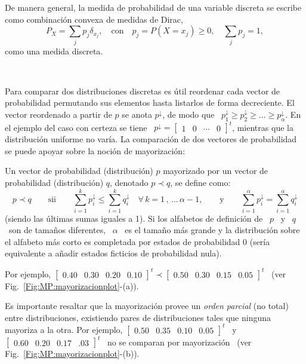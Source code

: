 De manera general, la medida de probabilidad de una variable discreta se escribe
como combinaci\'on convexa de medidas de Dirac,
%
\[
P_X =  \sum_j p_j  \delta_{x_j}, \quad  \mbox{con} \quad p_j =  P(X=x_j) \ge  0, \quad
\sum_j p_j = 1,
\]
%
\noindent \ie como una medida discreta.

\

Para comparar  dos distribuciones discretas  es \'util reordenar cada  vector de
probabilidad permutando  sus elementos hasta listarlos de  forma decreciente. El
vector  reordenado a  partir  de $p$  se  anota $p^\downarrow$,  de  modo que  \
$p^\downarrow_1 \ge  p^\downarrow_2 \ge \ldots \ge  p^\downarrow_\alpha$.  En el
ejemplo del caso con certeza se tiene  \ $p^\downarrow = \begin{bmatrix} 1 & 0 &
  \cdots  &  0 \end{bmatrix}^t$,  mientras  que  la  distribuci\'on uniforme  no
var\'ia.  La comparaci\'on de dos vectores de probabilidad se puede apoyar sobre
la noci\'on de mayorizaci\'on:
%
\begin{definicion}[Mayorizaci\'on]
\label{Def:MP:Mayorizacion}
%
  Un vector  de probabilidad  (distribuci\'on) $p$ mayorizado  por un  vector de
  probabilidad (distribuci\'on) $q$, denotado $p \prec q$, se define como:
  \[
  p   \prec  q   \qquad  \mbox{sii}   \qquad  \sum_{i=1}^k   p_i^\downarrow  \le
  \sum_{i=1}^k q_i^\downarrow \quad \forall \, k = 1 \, , \, \ldots \, \alpha-1,
  \qquad  \mbox{y} \qquad  \sum_{i=1}^\alpha p_i^\downarrow  = \sum_{i=1}^\alpha
  q_i^\downarrow
  \]
  (siendo las \'ultimas sumas iguales a 1).  Si los alfabetos de definici\'on de
  \ $p$  \ y \ $q$  \ son de tama\~nos  diferentes, \ $\alpha$ \  es el tama\~no
  m\'as grande y  la distribuci\'on sobre el alfabeto  m\'as corto es completada
  por  estados  de  probabilidad  0  (ser\'ia  equivalente  a  a\~nadir  estados
  ficticios de probabilidad nula).
\end{definicion}
%
\noindent   Por    ejemplo,   $\begin{bmatrix}   0.40   &   0.30    &   0.20   &
  0.10   \end{bmatrix}^t  \prec   \begin{bmatrix}   0.50  &   0.30   &  0.15   &
  0.05 \end{bmatrix}^t$ \ (ver Fig.~\ref{Fig:MP:mayorizacionplot}-(a)).

Es importante resaltar  que la mayorizaci\'on provee un  {\em orden parcial} (no
total)  entre  distribuciones,  existiendo  pares de  distribuciones  tales  que
ninguna mayoriza a la otra.  Por  ejemplo, $\begin{bmatrix} 0.50 & 0.35 & 0.10 &
  0.05  \end{bmatrix}^t$  \   y  \  $\begin{bmatrix}  0.60  &   0.20  &  0.17  &
  .03   \end{bmatrix}^t$  \   no   se  comparan   por   mayorizaci\'on  \   (ver
Fig.~\ref{Fig:MP:mayorizacionplot}-(b)).

